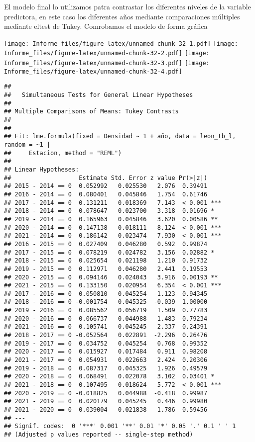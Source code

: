 \documentclass[
]{article}
\begin{document}
El modelo final lo utilizamos patra contrastar los diferentes niveles de
la variable predictora, en este caso los diferentes años mediante
comparaciones múltiples mediante eltest de Tukey. Comrobamos el modelo
de forma gráfica

\texttt{[image: Informe\_files/figure-latex/unnamed-chunk-32-1.pdf]}
\texttt{[image: Informe\_files/figure-latex/unnamed-chunk-32-2.pdf]}
\texttt{[image: Informe\_files/figure-latex/unnamed-chunk-32-3.pdf]}
\texttt{[image: Informe\_files/figure-latex/unnamed-chunk-32-4.pdf]}

\begin{verbatim}
## 
##   Simultaneous Tests for General Linear Hypotheses
## 
## Multiple Comparisons of Means: Tukey Contrasts
## 
## 
## Fit: lme.formula(fixed = Densidad ~ 1 + año, data = leon_tb_l, random = ~1 | 
##     Estacion, method = "REML")
## 
## Linear Hypotheses:
##                   Estimate Std. Error z value Pr(>|z|)    
## 2015 - 2014 == 0  0.052992   0.025530   2.076  0.39491    
## 2016 - 2014 == 0  0.080401   0.045846   1.754  0.61746    
## 2017 - 2014 == 0  0.131211   0.018369   7.143  < 0.001 ***
## 2018 - 2014 == 0  0.078647   0.023700   3.318  0.01696 *  
## 2019 - 2014 == 0  0.165963   0.045846   3.620  0.00586 ** 
## 2020 - 2014 == 0  0.147138   0.018111   8.124  < 0.001 ***
## 2021 - 2014 == 0  0.186142   0.023474   7.930  < 0.001 ***
## 2016 - 2015 == 0  0.027409   0.046280   0.592  0.99874    
## 2017 - 2015 == 0  0.078219   0.024782   3.156  0.02882 *  
## 2018 - 2015 == 0  0.025654   0.021198   1.210  0.91732    
## 2019 - 2015 == 0  0.112971   0.046280   2.441  0.19553    
## 2020 - 2015 == 0  0.094146   0.024043   3.916  0.00193 ** 
## 2021 - 2015 == 0  0.133150   0.020954   6.354  < 0.001 ***
## 2017 - 2016 == 0  0.050810   0.045254   1.123  0.94345    
## 2018 - 2016 == 0 -0.001754   0.045325  -0.039  1.00000    
## 2019 - 2016 == 0  0.085562   0.056719   1.509  0.77783    
## 2020 - 2016 == 0  0.066737   0.044988   1.483  0.79234    
## 2021 - 2016 == 0  0.105741   0.045245   2.337  0.24391    
## 2018 - 2017 == 0 -0.052564   0.022891  -2.296  0.26476    
## 2019 - 2017 == 0  0.034752   0.045254   0.768  0.99352    
## 2020 - 2017 == 0  0.015927   0.017484   0.911  0.98208    
## 2021 - 2017 == 0  0.054931   0.022663   2.424  0.20306    
## 2019 - 2018 == 0  0.087317   0.045325   1.926  0.49579    
## 2020 - 2018 == 0  0.068491   0.022078   3.102  0.03401 *  
## 2021 - 2018 == 0  0.107495   0.018624   5.772  < 0.001 ***
## 2020 - 2019 == 0 -0.018825   0.044988  -0.418  0.99987    
## 2021 - 2019 == 0  0.020179   0.045245   0.446  0.99980    
## 2021 - 2020 == 0  0.039004   0.021838   1.786  0.59456    
## ---
## Signif. codes:  0 '***' 0.001 '**' 0.01 '*' 0.05 '.' 0.1 ' ' 1
## (Adjusted p values reported -- single-step method)
\end{verbatim}
\end{document}
